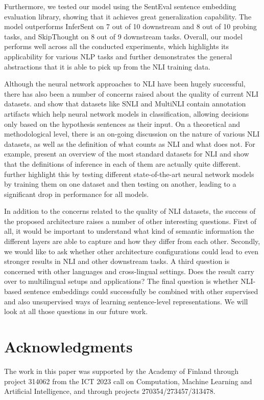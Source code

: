 \documentclass{nle}
\begin{document}
Furthermore, we tested our model using the SentEval sentence embedding evaluation library, showing that it achieves great generalization capability.  The model outperforms InferSent on 7 out of 10 downstream and 8 out of 10 probing tasks, and SkipThought on 8 out of 9 downstream tasks.   Overall, our model performs well across all the conducted experiments, which highlights its applicability for various NLP tasks and further demonstrates the general abstractions that it is able to pick up from the NLI training data.

Although the neural network approaches to NLI have been hugely successful, there has also been a number of concerns raised about the quality of current NLI datasets. \citet{gururangan:2018} and \citet{poliak2018} show that datasets like SNLI and MultiNLI contain annotation artifacts which help neural network models in classification, allowing decisions only based on the hypothesis sentences as their input. On a theoretical and methodological level, there is an on-going discussion on the nature of various NLI datasets, as well as the definition of what counts as NLI and what does not. For example, \citet{chatzikyriakidis2017} present an overview of the most standard datasets for NLI and show that the definitions of inference in each of them are actually quite different. \citet{talman2018testing} further highlight this by testing different state-of-the-art neural network models by training them on one dataset and then testing on another, leading to a significant drop in performance for all models.

In addition to the concerns related to the quality of NLI datasets, the success of the proposed architecture raises a number of other interesting questions. First of all, it would be important to understand what kind of semantic information the different layers are able to capture and how they differ from each other. Secondly, we would like to ask whether other architecture configurations could lead to even stronger results in NLI and other downstream tasks. A third question is concerned with other languages and cross-lingual settings. Does the result carry over to multilingual setups and applications? The final question is whether NLI-based sentence embeddings could successfully be combined with other supervised and also unsupervised ways of learning sentence-level representations. We will look at all those questions in our future work.

\section*{Acknowledgments}
The work in this paper was supported by the Academy of Finland through project 314062 from the ICT 2023 call on Computation, Machine Learning and Artificial Intelligence, and through projects 270354/273457/313478.
\end{document}
